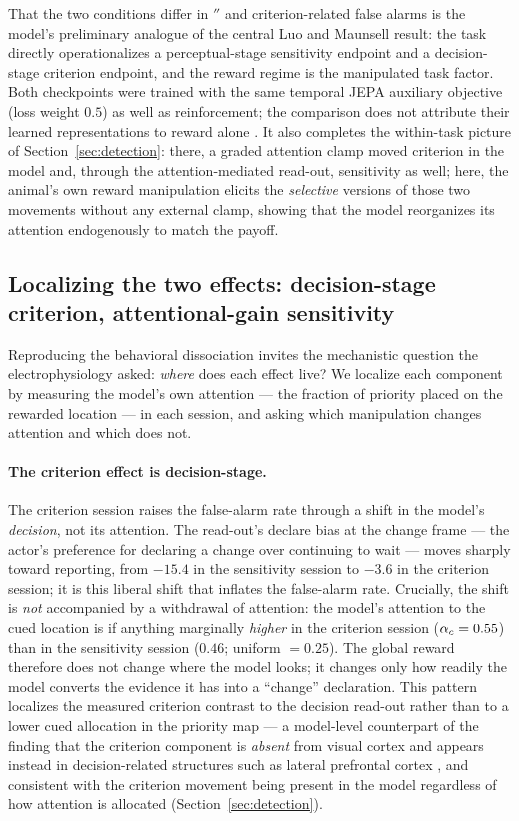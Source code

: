 That the two conditions differ in $\dprime$ and criterion-related false alarms is the
model's preliminary analogue of the central Luo and Maunsell result: the task directly
operationalizes a perceptual-stage sensitivity endpoint and a decision-stage criterion
endpoint, and the reward regime is the manipulated task factor. Both checkpoints were
trained with the same temporal JEPA auxiliary objective (loss weight $0.5$) as well as reinforcement; the
comparison does not attribute their learned representations to reward alone
\cite{luo_maunsell2018_criterion_sensitivity}. It also completes the within-task
picture of Section~\ref{sec:detection}: there, a graded attention clamp moved
criterion in the model and, through the attention-mediated read-out, sensitivity as
well; here, the animal's own reward manipulation elicits the \emph{selective} versions
of those two movements without any external clamp, showing that the model
reorganizes its attention endogenously to match the payoff.

\subsection*{Localizing the two effects: decision-stage criterion, attentional-gain
             sensitivity}

Reproducing the behavioral dissociation invites the mechanistic question the
electrophysiology asked: \emph{where} does each effect live? We localize each
component by measuring the model's own attention --- the fraction of priority placed
on the rewarded location --- in each session, and asking which manipulation changes
attention and which does not.

\paragraph{The criterion effect is decision-stage.} The criterion session raises the
false-alarm rate through a shift in the model's \emph{decision}, not its attention.
The read-out's declare bias at the change frame --- the actor's preference for
declaring a change over continuing to wait --- moves sharply toward reporting, from
$-15.4$ in the sensitivity session to $-3.6$ in the criterion session; it is this
liberal shift that inflates the false-alarm rate. Crucially, the shift is \emph{not}
accompanied by a withdrawal of attention: the model's attention to the cued location is
if anything marginally \emph{higher} in the criterion session ($\alpha_c = 0.55$)
than in the sensitivity session ($0.46$; uniform $= 0.25$). The global reward therefore
does not change where the model looks; it changes only how readily the model converts
the evidence it has into a ``change'' declaration. This pattern localizes the measured criterion contrast to the decision read-out rather
than to a lower cued allocation in the priority map --- a model-level counterpart of the finding that
the criterion component is \emph{absent} from visual cortex and appears instead in
decision-related structures such as lateral prefrontal cortex
\cite{luo_maunsell2018_criterion_sensitivity}, and consistent with the criterion
movement being present in the model regardless of how attention is allocated
(Section~\ref{sec:detection}).

